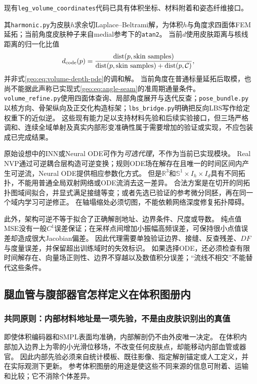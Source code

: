 \documentclass[11pt,a4paper]{article}
\numberwithin{equation}{section}
\theoremstyle{definition}
\newcommand{\R}{\mathbb R}
\begin{document}
现有\texttt{leg\_volume\_coordinates}代码已具有体积坐标、材料附着和姿态纤维接口。

其\texttt{harmonic.py}为皮肤$h$求余切Laplace--Beltrami解，为体积$h$与角度求四面体FEM延拓；当前角度皮肤种子来自medial参考下的\texttt{atan2}。
当前$d$使用皮肤距离与核线距离的归一化比值
\begin{equation}
 d_{\rm code}(p)=
 \frac{\operatorname{dist}(p,\text{skin samples})}
 {\operatorname{dist}(p,\text{skin samples})+
  \operatorname{dist}(p,\mathcal C)},
 \label{geo:eq:code-depth}
\end{equation}
并非式\eqref{geo:eq:volume-depth-pde}的调和解。
当前角度在普通标量延拓后取模，也尚不能据此声称已实现式\eqref{geo:eq:angle-seam}的准周期通量条件。
\texttt{volume\_refine.py}使用四面体查询、局部角度展开与迭代反查；\texttt{pose\_bundle.py}以核方向、骨架纵向及正交化构造标架；\texttt{lbs\_bridge.py}明确把反向LBS写作给定权重下的近似逆。
这些现有能力足以支持材料先验和后续实验接口，但三场严格调和、连续全域单射及真实内部形变准确性属于需要增加的验证或实现，不应包装成已完成结果。

原始设想中的INN或Neural ODE可作为\emph{可选代理}，不作为当前已实现模块。
Real NVP通过可逆耦合层构造可逆变换\cite{geoDinh2017}；规则ODE场在解存在且唯一的时间区间内产生可逆流，Neural ODE提供相应参数化方式\cite{geoChen2018}。
但是$\R^3$和$\mathbb S^1\times I_h\times I_d$具有不同拓扑，不能用普通全局双射网络或ODE流消去这一差异。
合法方案是在切开的同拓扑图域间拟合，并显式满足接缝等变；或者先选已验证的参考微分同胚，再在同一个域内学习可逆修正。
在轴塌缩处必须切图，不能依赖网络深度修复拓扑障碍。

此外，架构可逆不等于拟合了正确解剖地址、边界条件、尺度或导数。
纯点值MSE没有一般$C^1$误差保证；在采样点间增加小振幅高频误差，可保持很小点值误差却造成很大Jacobian偏差。
因此代理需要单独验证边界、接缝、反查残差、$D F$与度量误差，并保留超出训练域时的失效标识。
如果选择ODE，还必须检查有限时间解存在、向量场正则性、边界不穿越以及数值积分误差；“流线不相交”不能替代这些条件。

\subsection{腿血管与腹部器官怎样定义在体积图册内}
\label{geo:sub:internal}

\subsubsection{共同原则：内部材料地址是一项先验，不是由皮肤识别出的真值}
即使体积编码器和SMPL表面均准确，内部解剖仍不由外皮唯一决定。
在体积内部加入边界上为零的小光滑位移场，不改变任何皮肤点，却能移动内部血管或器官。
因此内部先验必须来自统计模板、既往影像、指定解剖锚定或人工定义，并在实际观测下更新。
参考体积图册的用途是使这些不同来源的信息可附着、运输和比较；它不消除个体差异。
\end{document}
